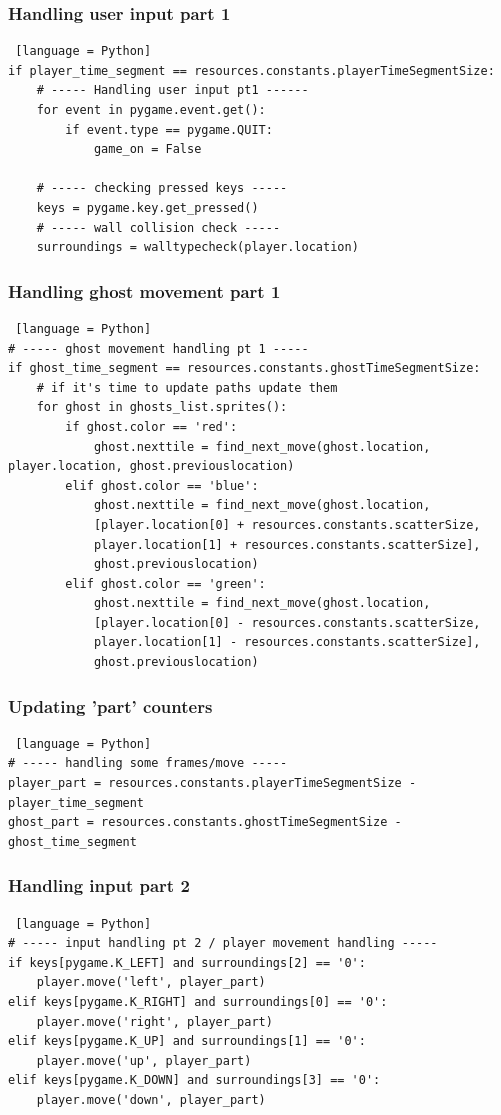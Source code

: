 \documentclass[11pt,a4paper]{report}
\begin{document}
				\subsubsection{Handling user input part 1}
					\begin{lstlisting} [language = Python]
if player_time_segment == resources.constants.playerTimeSegmentSize:
	# ----- Handling user input pt1 ------
	for event in pygame.event.get():
		if event.type == pygame.QUIT:
			game_on = False

	# ----- checking pressed keys -----
	keys = pygame.key.get_pressed()
	# ----- wall collision check -----
	surroundings = walltypecheck(player.location)
					\end{lstlisting}
				\subsubsection{Handling ghost movement part 1}
					\begin{lstlisting} [language = Python]
# ----- ghost movement handling pt 1 -----
if ghost_time_segment == resources.constants.ghostTimeSegmentSize:
	# if it's time to update paths update them
	for ghost in ghosts_list.sprites():
		if ghost.color == 'red':
			ghost.nexttile = find_next_move(ghost.location, player.location, ghost.previouslocation)
		elif ghost.color == 'blue':
			ghost.nexttile = find_next_move(ghost.location,
			[player.location[0] + resources.constants.scatterSize,
			player.location[1] + resources.constants.scatterSize],
			ghost.previouslocation)
		elif ghost.color == 'green':
			ghost.nexttile = find_next_move(ghost.location,
			[player.location[0] - resources.constants.scatterSize,
			player.location[1] - resources.constants.scatterSize],
			ghost.previouslocation)
					\end{lstlisting}
				\subsubsection{Updating 'part' counters}
					\begin{lstlisting} [language = Python]
# ----- handling some frames/move -----
player_part = resources.constants.playerTimeSegmentSize - player_time_segment
ghost_part = resources.constants.ghostTimeSegmentSize - ghost_time_segment
					\end{lstlisting}
				\subsubsection{Handling input part 2}
					\begin{lstlisting} [language = Python]
# ----- input handling pt 2 / player movement handling -----
if keys[pygame.K_LEFT] and surroundings[2] == '0':
	player.move('left', player_part)
elif keys[pygame.K_RIGHT] and surroundings[0] == '0':
	player.move('right', player_part)
elif keys[pygame.K_UP] and surroundings[1] == '0':
	player.move('up', player_part)
elif keys[pygame.K_DOWN] and surroundings[3] == '0':
	player.move('down', player_part)
					\end{lstlisting}
\end{document}
